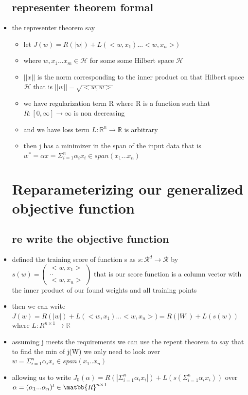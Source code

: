 \documentclass{article}
\begin{document}
\begin{itemize}
\subsection{representer theorem formal}
\item the representer theorem say 
\begin{itemize}
    \item let $J(w)=R(|w|)+L(<w,x_1)...<w,x_n>)$
    \item where $w,x_1...x_m\in \mathcal{H}$ for some some Hilbert space $\mathcal{H}$ 
    \item $||x ||$  is the norm corresponding to the inner product on that Hilbert space$ \mathcal{H}$ that is $||w||=\sqrt{<w,w>}$
    \item we have regularization term R where R is a function such that $R:[0,\infty]\rightarrow \infty$ is non decreasing 
\item and we have loss term  $L:\mathbb{R}^{n}\rightarrow \mathbb{R}$ is arbitrary
\item then j has a minimizer in the span of the input data that is $w^{*}=\alpha x=\Sigma_{i=1}^{n}\alpha_{i}x_{i}\in span(x_1...x_n)$
\end{itemize}
\section{Reparameterizing our generalized objective function}
\subsection{re write the objective function}
\item defined the training score of function s as $s:\mathcal{R}^{d}\rightarrow \mathcal{R}$ by $s(w)=\begin{pmatrix}
    <w,x_1>\\..\\<w,x_n>
\end{pmatrix}$ that is our score function is a column vector with the inner product of our found weights and all training points 
\item then we can write $J(w)=R(|w|)+L(<w,x_1)...<w,x_n>)=R(|W|)+L(s(w))$ where $L:R^{n\times1}\rightarrow\mathbb{R}$
\item assuming j meets the requirements we can use the repent theorem to say that to find the min of j(W) we only need to look over $w=\Sigma_{i=1}^{n}\alpha_{i}x_{i}\in span(x_1..x_n)$
\item allowing us to write $J_{0}(\alpha)=R(|\Sigma_{i=1}^{n}\alpha_{i}x_{i}|)+L(s(\Sigma_{i=1}^{n}\alpha_{i}x_{i}))$ over $\alpha = (\alpha_1...\alpha_n)^{t}\in \matbb{R}^{n\times 1}$

\end{itemize}
\end{document}
